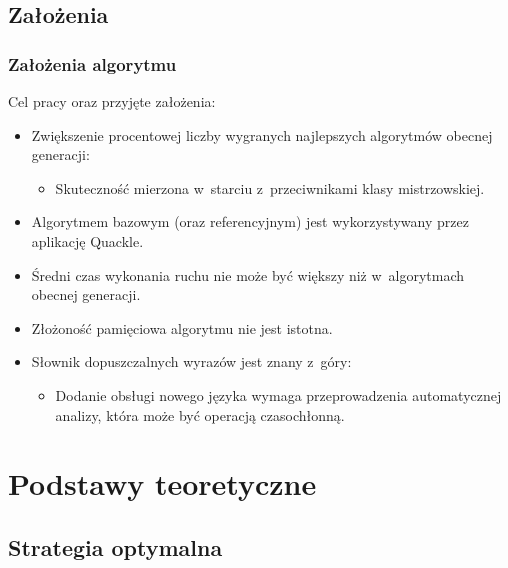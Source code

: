 \documentclass[10pt,a4paper]{beamer}
\begin{document}
\subsection{Założenia}

\begin{frame}
	\frametitle{Założenia algorytmu}
	
	Cel pracy oraz przyjęte założenia:

	\begin{itemize}
		\item Zwiększenie procentowej liczby wygranych najlepszych algorytmów obecnej generacji:
			\begin{itemize}
				\item Skuteczność mierzona w~starciu z~przeciwnikami klasy mistrzowskiej.
			\end{itemize}
		\item Algorytmem bazowym (oraz referencyjnym) jest wykorzystywany przez aplikację Quackle.
		\item Średni czas wykonania ruchu nie może być większy niż w~algorytmach obecnej generacji.
		\item Złożoność pamięciowa algorytmu nie jest istotna.
		\item Słownik dopuszczalnych wyrazów jest znany z~góry:
			\begin{itemize}
				\item Dodanie obsługi nowego języka wymaga przeprowadzenia automatycznej analizy, która może być operacją czasochłonną.
			\end{itemize}
	\end{itemize}
\end{frame}

\section{Podstawy teoretyczne}
\subsection{Strategia optymalna}
\end{document}
